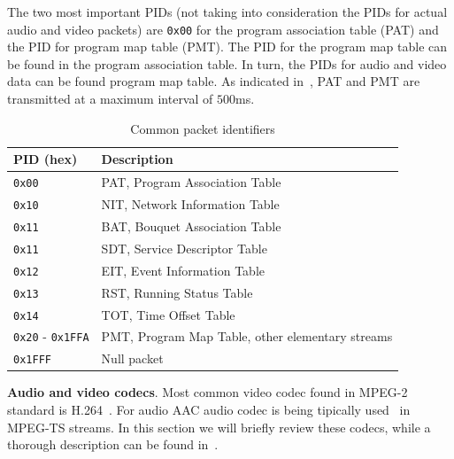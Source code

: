 The two most important PIDs (not taking into consideration the PIDs for 
actual audio and video packets) are \texttt{0x00} for the program association table (PAT)
and the PID for program map table (PMT). The PID for the program map table can be found
in the program association table. In turn, the PIDs for audio and video data can be 
found program map table. As indicated in~\cite{dtv}, PAT and PMT are transmitted at
a maximum interval of $500$ms.


\begin{table}
 \caption{Common packet identifiers}
\begin{tabular}{|l|l|}
  \hline
 PID (hex)                        & Description                                                      \\
  \hline
  \texttt{0x00}                   & PAT, Program Association Table                                   \\
  \texttt{0x10}                   & NIT, Network Information Table                                   \\
  \texttt{0x11}                   & BAT, Bouquet Association Table                                   \\
  \texttt{0x11}                   & SDT, Service Descriptor Table                                    \\
  \texttt{0x12}                   & EIT, Event Information Table                                     \\
  \texttt{0x13}                   & RST, Running Status Table                                        \\
  \texttt{0x14}                   & TOT, Time Offset Table                                           \\
  \texttt{0x20} - \texttt{0x1FFA} & PMT, Program Map Table, other elementary streams                 \\
  \texttt{0x1FFF}                 & Null packet                                                      \\
  \hline
\end{tabular}
\label{tab:pids}
\end{table}

{\bf Audio and video codecs}. Most common video codec found in MPEG-2 
standard is H.264~\cite{}. For audio AAC audio codec is being tipically
used~\cite{} in MPEG-TS streams. In this section we will briefly review 
these codecs, while a thorough description can be found in~\cite{}.

